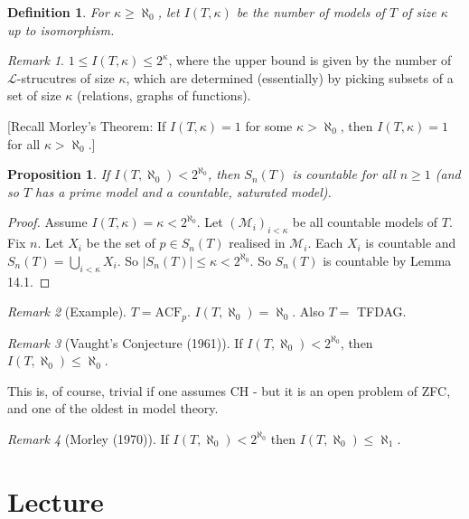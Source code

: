 \documentclass[]{article}
\theoremstyle{custhm}
\theoremstyle{cusdef}
\newtheorem{defin}[theorem]{Definition}
\theoremstyle{custhm}
\theoremstyle{custhm}
\theoremstyle{custhm}
\newtheorem{prop}[theorem]{Proposition}
\theoremstyle{ex}
\theoremstyle{custhm}
\theoremstyle{cusdef}
\theoremstyle{remark}
\newtheorem*{remark*}{Remark}
\theoremstyle{remark}
\theoremstyle{numremark}
\renewcommand{\L}{\mathcal{L}}
\newcommand{\M}{\mathcal{M}}
\newcommand{\acf}{\textrm{ACF}}
\begin{document}
\begin{defin}
	For $\kappa \ge \aleph_0$, let $I(T,\kappa)$ be the number of models of $T$ of size $\kappa$ up to isomorphism.
\end{defin}
\begin{remark*}
	$1 \le I(T,\kappa) \le 2^\kappa$, where the upper bound is given by the number of $\L$-strucutres of size $\kappa$, which are determined (essentially) by picking subsets of a set of size $\kappa$ (relations, graphs of functions).

	[Recall Morley's Theorem: If $I(T,\kappa) =1 $ for some $\kappa > \aleph_0$, then $I(T,\kappa) = 1$ for all $\kappa > \aleph_0$.]
\end{remark*}
\begin{prop}
	If $I(T,\aleph_0) < 2^{\aleph_0}$, then $S_n(T)$ is countable for all $n\ge 1$ (and so $T$ has a prime model and a countable, saturated model).
\end{prop}
\begin{proof}
	Assume $I(T,\kappa) = \kappa < 2^{\aleph_0}$. Let $(\M_i)_{i<\kappa}$ be all countable models of $T$. Fix $n$. Let $X_i$ be the set of $p \in S_n(T)$ realised in $\M_i$. Each $X_i$ is countable and $S_n(T) = \bigcup_{i<\kappa}X_i$. So $|S_n(T)|\le \kappa < 2^{\aleph_0}$. So $S_n(T)$ is countable by Lemma 14.1.
\end{proof}

\begin{remark*}[Example]
	$T = \acf_p$. $I(T,\aleph_0) = \aleph_0$. Also $T = $ TFDAG.
\end{remark*}

\begin{remark*}[Vaught's Conjecture (1961)]
	If $I(T,\aleph_0) < 2^{\aleph_0}$, then $I(T,\aleph_0) \le \aleph_0$.
\end{remark*}
This is, of course, trivial if one assumes CH - but it is an open problem of ZFC, and one of the oldest in model theory.
\begin{remark*}[Morley (1970)]
	If $I(T,\aleph_0) < 2^{\aleph_0}$ then $I(T,\aleph_0)\le \aleph_1$.
\end{remark*}

\section{Lecture}
\end{document}
